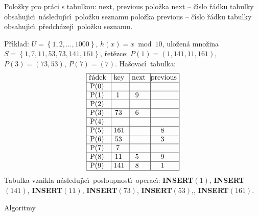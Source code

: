 \flushpar Polo\v zky pro pr\'aci s tabulkou: next, previous\newline 
\phantom{---}polo\v zka next -- \v c\'\i slo \v r\'adku tabulky 
obsahuj\'\i c\'\i\ n\'asleduj\'\i c\'\i\ polo\v z\-ku seznamu\newline 
\phantom{---}polo\v zka previous -- \v c\'\i slo \v r\'adku tabulky obsahuj\'\i c\'\i\ 
p\v redch\'azej\'\i\ polo\v zku seznamu.
\medskip

\flushpar P\v r\'\i klad: $U=\left\{1,2,\dots,1000\right\}$, $h\left(x\right)=x\bmod10$,\newline 
ulo\v zen\'a mno\v zina $S=\left\{1,7,11,53,73,141,161\right\}$,\newline 
\v ret\v ezce: $P\left(1\right)=\left(1,141,11,161\right)$, 
$P\left(3\right)=\left(73,53\right)$, $P\left(7\right)=\left(7\right)$.\newline 
Ha\v sovac\'\i\ tabulka:
$$\vtop{\offinterlineskip\halign {\strut\vrule\ # & \vrule\ # & \vrule\ # & \vrule \hfil # \hfil \vrule\cr\noalign{\hrule}\v r\'adek & key & next & previous\hfil \cr\noalign{\hrule}P(0) & & & \hfill \cr\noalign{\hrule}P(1) & 1 & 9 & \hfill \cr\noalign{\hrule}P(2) & & & \hfill \cr\noalign{\hrule}P(3) & 73 & 6 & \hfill \cr\noalign{\hrule}P(4) & & &\hfill \cr\noalign{\hrule}P(5) & 161 & & 8 \cr\noalign{\hrule}P(6) & 53 & & 3 \cr\noalign{\hrule}P(7) & 7 & &\hfill \cr\noalign{\hrule}P(8) & 11 & 5 & 9 \cr\noalign{\hrule}P(9) & 141 & 8 & 1 \cr\noalign{\hrule}}}$$
\flushpar Tabulka vznikla n\'asleduj\'\i c\'\i\ posloupnost\'\i\ 
operac\'\i :\newline 
{\bf INSERT$\left(1\right)$}, {\bf INSERT$\left(141\right)$}, {\bf INSERT$\left(11\right)$}, {\bf INSERT$\left(73\right)$}, 
{\bf INSERT$\left(53\right)$},, {\bf INSERT$\left(161\right)$}. 
\medskip

\subhead
Algoritmy
\endsubhead
\smallskip

